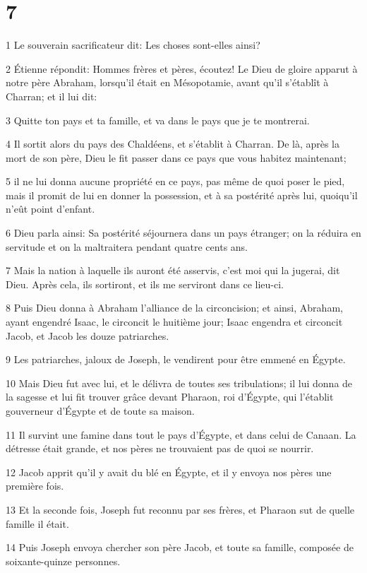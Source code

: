 \chapter{7}

\par 1 Le souverain sacrificateur dit: Les choses sont-elles ainsi?
\par 2 Étienne répondit: Hommes frères et pères, écoutez! Le Dieu de gloire apparut à notre père Abraham, lorsqu'il était en Mésopotamie, avant qu'il s'établît à Charran; et il lui dit:
\par 3 Quitte ton pays et ta famille, et va dans le pays que je te montrerai.
\par 4 Il sortit alors du pays des Chaldéens, et s'établit à Charran. De là, après la mort de son père, Dieu le fit passer dans ce pays que vous habitez maintenant;
\par 5 il ne lui donna aucune propriété en ce pays, pas même de quoi poser le pied, mais il promit de lui en donner la possession, et à sa postérité après lui, quoiqu'il n'eût point d'enfant.
\par 6 Dieu parla ainsi: Sa postérité séjournera dans un pays étranger; on la réduira en servitude et on la maltraitera pendant quatre cents ans.
\par 7 Mais la nation à laquelle ils auront été asservis, c'est moi qui la jugerai, dit Dieu. Après cela, ils sortiront, et ils me serviront dans ce lieu-ci.
\par 8 Puis Dieu donna à Abraham l'alliance de la circoncision; et ainsi, Abraham, ayant engendré Isaac, le circoncit le huitième jour; Isaac engendra et circoncit Jacob, et Jacob les douze patriarches.
\par 9 Les patriarches, jaloux de Joseph, le vendirent pour être emmené en Égypte.
\par 10 Mais Dieu fut avec lui, et le délivra de toutes ses tribulations; il lui donna de la sagesse et lui fit trouver grâce devant Pharaon, roi d'Égypte, qui l'établit gouverneur d'Égypte et de toute sa maison.
\par 11 Il survint une famine dans tout le pays d'Égypte, et dans celui de Canaan. La détresse était grande, et nos pères ne trouvaient pas de quoi se nourrir.
\par 12 Jacob apprit qu'il y avait du blé en Égypte, et il y envoya nos pères une première fois.
\par 13 Et la seconde fois, Joseph fut reconnu par ses frères, et Pharaon sut de quelle famille il était.
\par 14 Puis Joseph envoya chercher son père Jacob, et toute sa famille, composée de soixante-quinze personnes.
